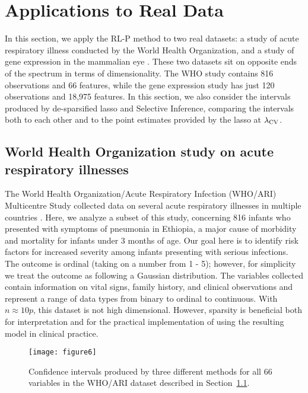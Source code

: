 \section{Applications to Real Data}\label{Sec:RDA}

In this section, we apply the RL-P method to two real datasets: a study of acute respiratory illness conducted by the World Health Organization, and a study of gene expression in the mammalian eye \citep{Scheetz2006}. These two datasets sit on opposite ends of the spectrum in terms of dimensionality. The WHO study contains 816 observations and 66 features, while the gene expression study has just 120 observations and 18,975 features. In this section, we also consider the intervals produced by de-sparsified lasso and Selective Inference, comparing the intervals both to each other and to the point estimates provided by the lasso at $\lambda_{\textrm{CV}}$.

\subsection{World Health Organization study on acute respiratory illnesses}\label{Sec:WHO-ARI}

The World Health Organization/Acute Respiratory Infection (WHO/ARI) Multicentre Study collected data on several acute respiratory illnesses in multiple countries \citep{Harrell1998}. Here, we analyze a subset of this study, concerning 816 infants who presented with symptoms of pneumonia in Ethiopia, a major cause of morbidity and mortality for infants under 3 months of age. Our goal here is to identify risk factors for increased severity among infants presenting with serious infections. The outcome is ordinal (taking on a number from 1 - 5); however, for simplicity we treat the outcome as following a Gaussian distribution. The variables collected contain information on vital signs, family history, and clinical observations and represent a range of data types from binary to ordinal to continuous. With $n \approx 10p$, this dataset is not high dimensional. However, sparsity is beneficial both for interpretation and for the practical implementation of using the resulting model in clinical practice.

\begin{figure}[htb!]
  \begin{center}
    \texttt{[image: figure6]}
    \caption{\label{Fig:comparison_data_whoari} Confidence intervals produced by three different methods for all 66 variables in the WHO/ARI dataset described in Section~\ref{Sec:WHO-ARI}.}
  \end{center}
\end{figure}


